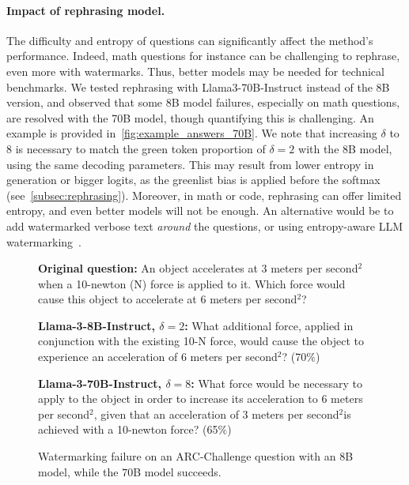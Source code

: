 \paragraph{\textbf{Impact of rephrasing model.}}
The difficulty and entropy of questions can significantly affect the method's performance. 
Indeed, math questions for instance can be challenging to rephrase, even more with watermarks. 
Thus, better models may be needed for technical benchmarks.
We tested rephrasing with Llama3-70B-Instruct instead of the 8B version, and  observed that some 8B model failures, especially on math questions, are resolved with the 70B model, though quantifying this is challenging. 
An example is provided in~\autoref{fig:example_answers_70B}.
We note that increasing $\delta$ to 8 is necessary to match the green token proportion of $\delta=2$ with the 8B model, using the same decoding parameters.
This may result from lower entropy in generation or bigger logits, as the greenlist bias is applied before the softmax (see~\autoref{subsec:rephrasing}).
Moreover, in math or code, rephrasing can offer limited entropy, and even better models will not be enough.
An alternative would be to add watermarked verbose text \emph{around} the questions, or using entropy-aware LLM watermarking~\citep{lee2023wrote}.

\begin{figure}[b!]
    \vspace{-0.3cm}
    \centering
    \begin{tcolorbox}[colframe=metablue, colback=white]
        \footnotesize
        \textbf{Original question:} 
        An object accelerates at 3 meters per second$^2$ when a 10-newton (N) force is applied to it. Which force would cause this object to accelerate at 6 meters per second$^2$?
        \begin{minipage}{0.42\textwidth}
            \vspace{0.1cm}
            \textbf{Llama-3-8B-Instruct, $\delta=2$:} What additional force, applied in conjunction with the existing 10-N force, would cause the object to experience an acceleration of 6 meters per second$^2$? (70$\%$)
        \end{minipage}\hspace{0.04\textwidth}%
        \begin{minipage}{0.54\textwidth}
            \vspace{0.1cm}
            \textbf{Llama-3-70B-Instruct, $\delta=8$:} What force would be necessary to apply to the object in order to increase its acceleration to 6 meters per second$^2$, given that an acceleration of 3 meters per second$^2$is achieved with a 10-newton force? (65$\%$)
        \end{minipage}
    \end{tcolorbox}
    \vspace{-0.2cm}
    \caption{
    Watermarking failure on an ARC-Challenge question with an $8$B model, while the $70$B model succeeds.
    }
    
\label{fig:example_answers_70B}
\end{figure}



